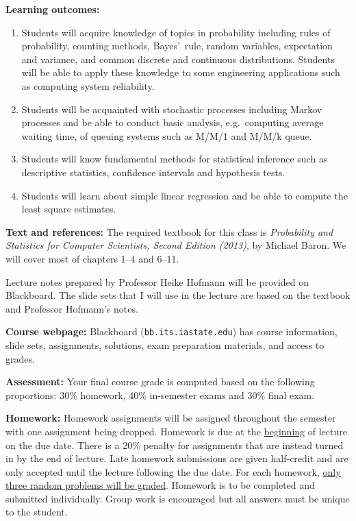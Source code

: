 \documentclass[10pt]{article}
\newcommand{\sep}{\vspace*{0.4cm}}
\newcommand{\tab}{\hspace*{0.8cm}}
\begin{document}
\textbf{Learning outcomes:}
\begin{enumerate}
  \item Students will acquire knowledge of topics in probability
    including rules of probability, counting methods, Bayes'~rule, random variables,
    expectation and variance, and common discrete and continuous distributions.
    Students will be able to apply these knowledge to some engineering
    applications such as computing system reliability.
  \item Students will be acquainted with stochastic processes including Markov processes and be able to
    conduct basic analysis, e.g.~computing average waiting time, 
    of queuing systems such as M/M/1 and M/M/k queue.
  \item Students will know fundamental methods for statistical inference such as descriptive statistics, confidence intervals and hypothesis tests.
  \item Students will learn about simple linear regression and be able to
    compute the least square estimates.
  \end{enumerate}
  \sep

\textbf{Text and references:} 
The required textbook for this class is \textit{Probability and Statistics for
  Computer Scientists, Second Edition (2013)}, by Michael Baron. We will cover most of chapters 1--4 and 6--11. 

Lecture notes prepared by Professor Heike Hofmann will be provided on Blackboard.
The slide sets that I will use in the lecture are based on the textbook and
Professor Hofmann's notes.
\sep

\textbf{Course webpage:} Blackboard ({\tt bb.its.iastate.edu})
has course information, slide sets, assignments,
solutions, exam preparation materials, and access to grades.
\sep

\textbf{Assessment:} Your final course grade is computed based on the following proportions:
30\% homework, 40\% in-semester exams and 30\% final exam.
\sep

\newpage
\tab \textbf{Homework:}
Homework assignments will be assigned throughout the semester with one assignment being dropped.
Homework is due at the \underline{beginning} of lecture on the due date.
There is a 20\% penalty for assignments that are instead turned in by the end of lecture.
Late homework submissions are given half-credit and are only accepted until the lecture following the due date. 
For each homework, \underline{only three random problems will be graded}.
Homework is to be completed and submitted individually. Group work is encouraged but all answers must be unique to the student.
\sep
\end{document}
